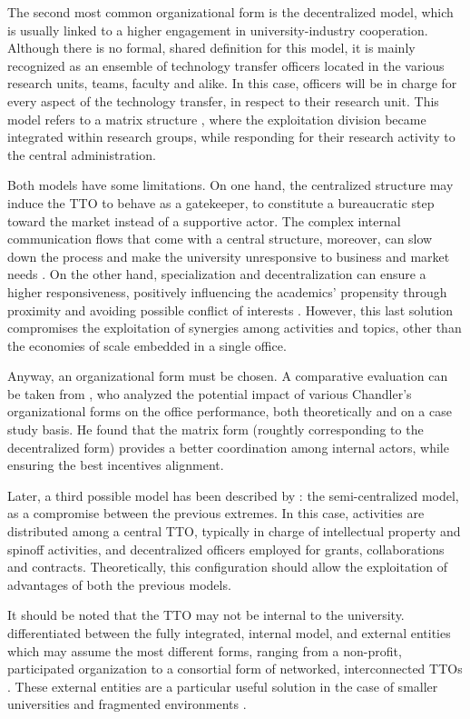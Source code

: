 The second most common organizational form is the decentralized model, which is usually linked to a higher engagement in university-industry cooperation. Although there is no formal, shared definition for this model, it is mainly recognized as an ensemble of technology transfer officers located in the various research units, teams, faculty and alike. In this case, officers will be in charge for every aspect of the technology transfer, in respect to their research unit. This model refers to a matrix structure \citep{Debackere2005}, where the exploitation division became integrated within research groups, while responding for their research activity to the central administration.

Both models have some limitations. On one hand, the centralized structure may induce the TTO to behave as a gatekeeper, to constitute a bureaucratic step toward the market instead of a supportive actor. The complex internal communication flows that come with a central structure, moreover, can slow down the process and make the university unresponsive to business and market needs \citep{Litan2008}. On the other hand, specialization and decentralization can ensure a higher responsiveness, positively influencing the academics' propensity through proximity and avoiding possible conflict of interests \citep{Debackere2005}. However, this last solution compromises the exploitation of synergies among activities and topics, other than the economies of scale embedded in a single office.

Anyway, an organizational form must be chosen. A comparative evaluation can be taken from \citet{Bercovitz2001}, who analyzed the potential impact of various Chandler's organizational forms on the office performance, both theoretically and on a case study basis. He found that the matrix form (roughtly corresponding to the decentralized form) provides a better coordination among internal actors, while ensuring the best incentives alignment. 

Later, a third possible model has been described by \citet{Brescia2016}: the semi-centralized model, as a compromise between the previous extremes. In this case, activities are distributed among a central TTO, typically in charge of intellectual property and spinoff activities, and decentralized officers employed for grants, collaborations and contracts. Theoretically, this configuration should allow the exploitation of advantages of both the previous models. 

It should be noted that the TTO may not be internal to the university. \citet{Fisher2002} differentiated between the fully integrated, internal model, and external entities which may assume the most different forms, ranging from a non-profit, participated organization to a consortial form of networked, interconnected TTOs \citep{Brescia2016}. These external entities are a particular useful solution in the case of smaller universities and fragmented environments \citep{Debackere2005}.

